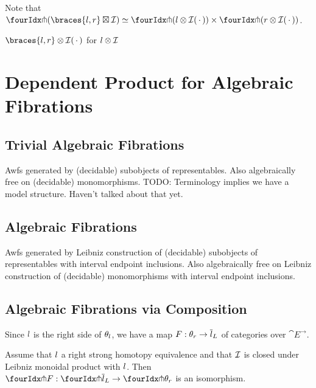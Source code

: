 \documentclass[reqno,10pt,a4paper,oneside]{amsart}
\begin{document}
Note that $\liftr{(\braces{\intervall, \intervalr} \boxtimes \cal{I})} \simeq \liftr{(l \otimes \cal{I}\brarghole)} \times \liftr{(r \otimes \cal{I}\brarghole)}$.


 $\braces{l, r} \otimes \cal{I}\brarghole$ for $l \otimes \cal{I}$


\section{Dependent Product for Algebraic Fibrations}

\subsection{Trivial Algebraic Fibrations}

Awfs generated by (decidable) subobjects of representables.
Also algebraically free on (decidable) monomorphisms.
TODO: Terminology implies we have a model structure.
Haven't talked about that yet.

\subsection{Algebraic Fibrations}

Awfs generated by Leibniz construction of (decidable) subobjects of representables with interval endpoint inclusions.
Also algebraically free on Leibniz construction of (decidable) monomorphisms with interval endpoint inclusions.

\subsection{Algebraic Fibrations via Composition}

Since $\intervall$ is the right side of $\thetal$, we have a map $F : \thetar \to \overline{\intervall}_L$ of categories over $\cat{E}^{\to}$.

\begin{lemma}
Assume that $\intervall$ a right strong homotopy equivalence and that $\cal{I}$ is closed under Leibniz monoidal product with $\intervall$.
Then $\liftr{F} : \liftr{\overline{\intervall}_L} \to \liftr{\thetar}$ is an isomorphism.
\end{lemma}
\end{document}
